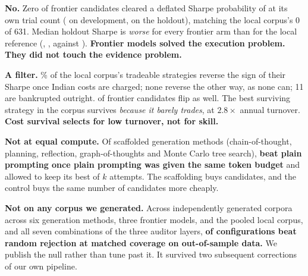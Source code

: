 \documentclass[11pt,a4paper]{article}
\begin{document}
\begin{finding}[title={3.\ \ Does better code become better evidence? \hfill\tagfrontier\ \tagindep}]
\textbf{No.} Zero of \aaGvTotal{} frontier candidates cleared a deflated Sharpe
probability of \aaGvBar{} at its own trial count (\aaGvClearedDev{} on development,
\aaGvClearedHoldout{} on the holdout), matching the local corpus's 0 of 631. Median holdout
Sharpe is \emph{worse} for every frontier arm than for the local reference
(\pgmGPTHoldMed, \pgmClaudeHoldMed, \pgmGeminiHoldMed{} against \pgmLocalHoldMed).
\textbf{Frontier models solved the execution problem. They did not touch the evidence problem.}
\end{finding}

\begin{finding}[title={4.\ \ Are transaction costs a haircut or a filter? \hfill\taglocal\ \tagfrontier}]
\textbf{A filter.} \aaLocalFlipsPct\% of the local corpus's \aaLocalFlipsOf{} tradeable strategies
reverse the sign of their Sharpe once Indian costs are charged; none reverse the other way, as
none can; 11 are bankrupted outright. \aaGvFlipsTotal{} of \aaGvTotal{} frontier candidates flip
as well. The best surviving strategy in the corpus survives \emph{because it barely trades}, at
$2.8\times$ annual turnover. \textbf{Cost survival selects for low turnover, not for skill.}
\end{finding}

\begin{finding}[title={5.\ \ Does more elaborate prompting help? \hfill\tagmethod\ \tagprereg}]
\textbf{Not at equal compute.} Of \pgmScaffoldArms{} scaffolded generation methods
(chain-of-thought, planning, reflection, graph-of-thoughts and Monte Carlo tree search),
\textbf{\pgmScaffoldWins{} beat plain prompting once plain prompting was given the same token
budget} and allowed to keep its best of $k$ attempts. The scaffolding buys candidates, and the
control buys the same number of candidates more cheaply.
\end{finding}

\begin{finding}[title={6.\ \ Can the auditor tell in advance which ones are real? \hfill\tagindep}]
\textbf{Not on any corpus we generated.} Across \pgmNullCorpora{} independently generated corpora
across six generation methods, three frontier models, and the pooled local corpus, and all seven
combinations of the three auditor layers, \textbf{\pgmNullBeating{} of \pgmNullCombos{}
configurations beat random rejection at matched coverage on out-of-sample data.} We publish the
null rather than tune past it. It survived two subsequent corrections of our own pipeline.
\end{finding}
\end{document}
